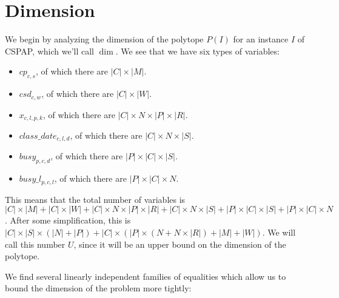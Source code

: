 \section{Dimension}

We begin by analyzing the dimension of the polytope $P(I)$ for an instance $I$ of CSPAP, which we'll call $\dim$. We see that we have six types of variables:
\begin{itemize}
\item $cp_{c, s}$, of which there are $|C| \times |M|$.
\item $csd_{c, w}$, of which there are $|C| \times |W|$.
\item $x_{c, l, p, k}$, of which there are $|C| \times N \times |P| \times |R|$.
\item $class\_date_{c, l, d}$, of which there are $|C| \times N \times |S|$.
\item $busy_{p, c, d}$, of which there are $|P| \times |C| \times |S|$.
\item $busy\_l_{p, c, l}$, of which there are $|P| \times |C| \times N$.
\end{itemize}

This means that the total number of variables is $|C| \times |M| + |C| \times |W| + |C| \times N \times |P| \times |R| + |C| \times N \times |S| + |P| \times |C| \times |S| + |P| \times |C| \times N$. After some simplification, this is $|C| \times |S| \times (|N| + |P|) + |C| \times (|P| \times (N + N \times |R|) +|M| + |W|)$. We will call this number $U$, since it will be an upper bound on the dimension of the polytope.


We find several linearly independent families of equalities which allow us to bound the dimension of the problem more tightly:

